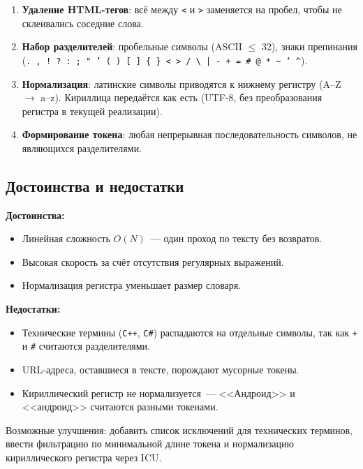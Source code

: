 \documentclass[12pt,a4paper]{article}
\begin{document}
\begin{enumerate}
    \item \textbf{Удаление HTML-тегов}: всё между \texttt{<} и \texttt{>} заменяется на пробел, чтобы не склеивались соседние слова.

    \item \textbf{Набор разделителей}: пробельные символы (ASCII $\leq$ 32), знаки препинания (\texttt{. , ! ? : ; " ' ( ) [ ] \{ \} < > / \textbackslash{} | - + = \# @ * \~{} ` \^{}}).

    \item \textbf{Нормализация}: латинские символы приводятся к нижнему регистру (A--Z $\to$ a--z). Кириллица передаётся как есть (UTF-8, без преобразования регистра в текущей реализации).

    \item \textbf{Формирование токена}: любая непрерывная последовательность символов, не являющихся разделителями.
\end{enumerate}

\subsection{Достоинства и недостатки}

\textbf{Достоинства:}
\begin{itemize}
    \item Линейная сложность $O(N)$~--- один проход по тексту без возвратов.
    \item Высокая скорость за счёт отсутствия регулярных выражений.
    \item Нормализация регистра уменьшает размер словаря.
\end{itemize}

\textbf{Недостатки:}
\begin{itemize}
    \item Технические термины (\texttt{C++}, \texttt{C\#}) распадаются на отдельные символы, так как \texttt{+} и \texttt{\#} считаются разделителями.
    \item URL-адреса, оставшиеся в тексте, порождают мусорные токены.
    \item Кириллический регистр не нормализуется~--- <<Андроид>> и <<андроид>> считаются разными токенами.
\end{itemize}

Возможные улучшения: добавить список исключений для технических терминов, ввести фильтрацию по минимальной длине токена и нормализацию кириллического регистра через ICU.
\end{document}
